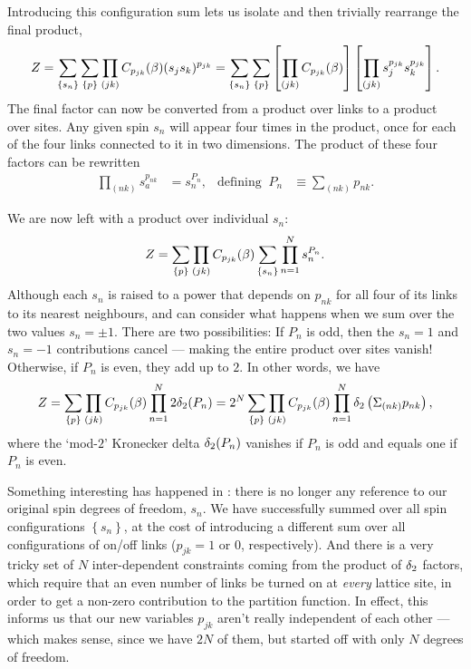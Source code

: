 Introducing this configuration sum lets us isolate and then trivially rearrange the final product,
\begin{equation*}
  Z = \sum_{\left\{s_n\right\}} \sum_{\left\{p\right\}} \prod_{(jk)} C_{p_{jk}}(\beta) (s_j s_k)^{p_{jk}} = \sum_{\left\{s_n\right\}} \sum_{\left\{p\right\}} \left[\prod_{(jk)} C_{p_{jk}}(\beta)\right] \left[\prod_{(jk)} s_j^{p_{jk}} s_k^{p_{jk}}\right].
\end{equation*}
The final factor can now be converted from a product over links to a product over sites.
Any given spin $s_n$ will appear four times in the product, once for each of the four links connected to it in two dimensions.
The product of these four factors can be rewritten
\begin{align*}
  \prod_{(nk)} s_a^{p_{nk}} & = s_n^{P_n}, &
  \mbox{defining } \ P_n & \equiv \sum_{(nk)} p_{nk}.
\end{align*}

We are now left with a product over individual $s_n$:
\begin{equation*}
  Z = \sum_{\left\{p\right\}} \prod_{(jk)} C_{p_{jk}}(\beta) \sum_{\left\{s_n\right\}} \prod_{n = 1}^N s_n^{P_n}.
\end{equation*}
Although each $s_n$ is raised to a power that depends on $p_{nk}$ for all four of its links to its nearest neighbours, and can consider what happens when we sum over the two values $s_n = \pm 1$.
There are two possibilities: If $P_n$ is odd, then the $s_n = 1$ and $s_n = -1$ contributions cancel --- making the entire product over sites vanish!
Otherwise, if $P_n$ is even, they add up to $2$.
In other words, we have
\begin{equation}
  \label{eq:constrained_Ising}
  Z = \sum_{\left\{p\right\}} \prod_{(jk)} C_{p_{jk}}(\beta) \prod_{n = 1}^N 2\delta_2(P_n) = 2^N \sum_{\left\{p\right\}} \prod_{(jk)} C_{p_{jk}}(\beta) \prod_{n = 1}^N \delta_2\left(\Sigma_{(nk)} p_{nk}\right),
\end{equation}
where the `mod-$2$' Kronecker delta $\delta_2(P_n)$ vanishes if $P_n$ is odd and equals one if $P_n$ is even.

Something interesting has happened in : there is no longer any reference to our original spin degrees of freedom, $s_n$.
We have successfully summed over all spin configurations $\left\{s_n\right\}$, at the cost of introducing a different sum over all configurations of on/off links ($p_{jk} = 1$ or $0$, respectively).
And there is a very tricky set of $N$ inter-dependent constraints coming from the product of $\delta_2$ factors, which require that an even number of links be turned on at \textit{every} lattice site, in order to get a non-zero contribution to the partition function.
In effect, this informs us that our new variables $p_{jk}$ aren't really independent of each other --- which makes sense, since we have $2N$ of them, but started off with only $N$ degrees of freedom.

